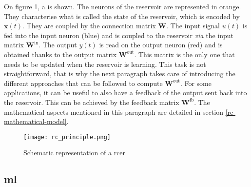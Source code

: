 On figure \ref{rc_principle}, a \rcer is shown. The neurons of the reservoir are represented in orange. They characterise what is called the state of the reservoir, which is encoded by $\mathbf{x}(t)$. They are coupled by the connection matrix $\mathbf{W}$. The input signal $u(t)$ is fed into the input neuron (blue) and is coupled to the reservoir \textit{via} the input matrix $\mathbf{W}^{\text{in}}$. The output $y(t)$ is read on the output neuron (red) and is obtained thanks to the output matrix $\mathbf{W}^{\text{out}}$. This matrix is the only one that needs to be updated when the reservoir is learning. This task is not straightforward, that is why the next paragraph takes care of introducing the different approaches that can be followed to compute $\mathbf{W}^{\text{out}}$. For some applications, it can be useful to also have a feedback of the output sent back into the reservoir. This can be achieved by the feedback matrix $\mathbf{W}^{\text{fb}}$. The mathematical aspects mentioned in this paragraph are detailed in section \ref{rc-mathematical-model}.

\begin{figure}[h]
	\centering
	\texttt{[image: rc\_principle.png]}
	\caption{Schematic representation of a \acrlong{rcer} \cite{financialTimeSeries}}
	\label{rc_principle}
\end{figure}


\subsection{\acrlong{ml}}

